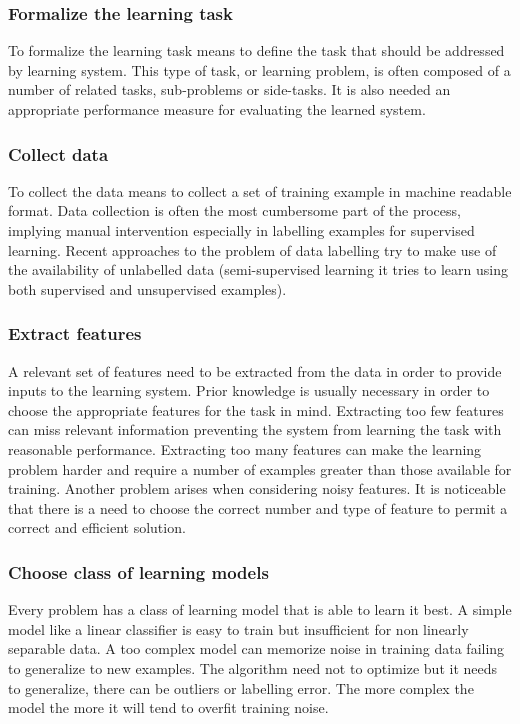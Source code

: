 		\subsubsection{Formalize the learning task}
		To formalize the learning task means to define the task that should be addressed by learning system.
		This type of task, or learning problem, is often composed of a number of related tasks, sub-problems or side-tasks.
		It is also needed an appropriate performance measure for evaluating the learned system.

		\subsubsection{Collect data}
		To collect the data means to collect a set of training example in machine readable format.
		Data collection is often the most cumbersome part of the process, implying manual intervention especially in labelling examples for supervised learning.
		Recent approaches to the problem of data labelling try to make use of the availability of unlabelled data (semi-supervised learning it tries to learn using both supervised and unsupervised examples).

		\subsubsection{Extract features}
		A relevant set of features need to be extracted from the data in order to provide inputs to the learning system.
		Prior knowledge is usually necessary in order to choose the appropriate features for the task in mind.
		Extracting too few features can miss relevant information preventing the system from learning the task with reasonable performance.
		Extracting too many features can make the learning problem harder and require a number of examples greater than those available for training.
		Another problem arises when considering noisy features.
		It is noticeable that there is a need to choose the correct number and type of feature to permit a correct and efficient solution.

		\subsubsection{Choose class of learning models}
		Every problem has a class of learning model that is able to learn it best.
		A simple model like a linear classifier is easy to train but insufficient for non linearly separable data.
		A too complex model can memorize noise in training data failing to generalize to new examples.
		The algorithm need not to optimize but it needs to generalize, there can be outliers or labelling error.
		The more complex the model the more it will tend to overfit training noise.

